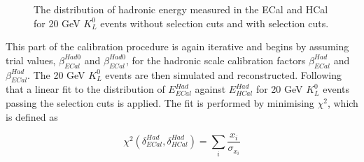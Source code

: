\begin{figure}
\caption[The distribution of hadronic energy measured in the ECal and HCal for 20 GeV $K^{0}_{L}$ events with and without selection cuts.]{The distribution of hadronic energy measured in the ECal and HCal for 20 GeV $K^{0}_{L}$ events \protect{} without selection cuts and \protect{} with selection cuts.}
\label{fig:hadscaleselection}
\end{figure}

This part of the calibration procedure is again iterative and begins by assuming trial values, $\beta^{Had0}_{ECal}$ and $\beta^{Had0}_{ECal}$, for the hadronic scale calibration factors $\beta^{Had}_{ECal}$ and $\beta^{Had}_{ECal}$.  The 20 GeV $K^{0}_{L}$ events are then simulated and reconstructed.  Following that a linear fit to the distribution of $E^{Had}_{ECal}$ against $E^{Had}_{HCal}$ for 20 GeV $K^{0}_{L}$ events passing the selection cuts is applied.  The fit is performed by minimising $\chi^{2}$, which is defined as

\begin{equation}
\chi^{2}(\delta^{Had}_{ECal}, \delta^{Had}_{HCal}) = \sum_{i} \frac{x_{i}}{\sigma_{x_{i}}}
\end{equation}

